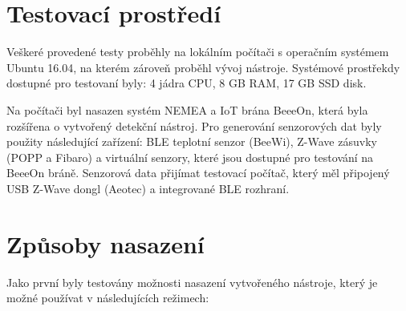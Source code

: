 
\section{Testovací prostředí}
Veškeré provedené testy proběhly na lokálním počítači s operačním systémem Ubuntu 16.04,
na kterém zároveň proběhl vývoj nástroje. Systémové
prostřekdy dostupné pro testovaní byly: 4 jádra CPU, 8 GB RAM, 17 GB SSD disk.

Na počítači byl nasazen systém NEMEA a IoT brána BeeeOn, která byla rozšířena o vytvořený detekční 
nástroj. Pro generování senzorových dat byly použity následující zařízení: BLE teplotní senzor (BeeWi), 
Z-Wave zásuvky (POPP a Fibaro) a virtuální senzory, které jsou dostupné pro testování na BeeeOn bráně.
Senzorová data přijímat testovací počítač, který měl připojený USB Z-Wave dongl (Aeotec) a integrované
BLE rozhraní.

\section{Způsoby nasazení}
Jako první byly testovány možnosti nasazení vytvořeného nástroje, který je možné používat v 
následujících režimech:

